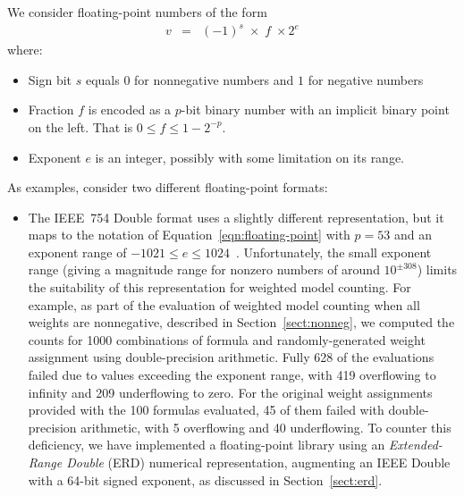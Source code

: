 \documentclass{easychair}
\begin{document}
We consider floating-point numbers of the form
\begin{eqnarray}
v & = & (-1)^s \; \times \; f \; \times 2^{e} \label{eqn:floating-point}
\end{eqnarray}
where:
\begin{itemize}
\item Sign bit $s$ equals $0$ for nonnegative numbers and $1$ for negative numbers
\item Fraction $f$ is encoded as a $p$-bit binary number with an implicit binary point on the left.  That is $0 \leq f \leq 1-2^{-p}$.
\item Exponent $e$ is an integer, possibly with some limitation on its range.
\end{itemize}
As examples, consider two different floating-point formats:
\begin{itemize}
\item The IEEE~754 Double format uses a slightly different
  representation, but it maps to the notation of
  Equation~\ref{eqn:floating-point} with $p=53$ and an exponent range
  of $-1021 \leq e \leq 1024$~\cite{overton:siam:2001}.
  Unfortunately, the small exponent range (giving a magnitude range
  for nonzero numbers of around $10^{\pm 308}$) limits the suitability
  of this representation for weighted model counting.  For example, as
  part of the evaluation of weighted model counting when all weights
  are nonnegative, described in Section~\ref{sect:nonneg}, we computed
  the counts for 1000 combinations of formula and randomly-generated
  weight assignment using double-precision arithmetic.  Fully 628 of
  the evaluations failed due to values exceeding the exponent range,
  with 419 overflowing to infinity and 209 underflowing to zero.  For
  the original weight assignments provided with the 100 formulas
  evaluated, 45 of them failed with double-precision arithmetic, with
  5 overflowing and 40 underflowing.  To counter this deficiency, we
  have implemented a floating-point library using an
  \emph{Extended-Range Double} (ERD) numerical representation,
  augmenting an IEEE Double with a 64-bit signed exponent, as
  discussed in Section~\ref{sect:erd}.


\end{itemize}
\end{document}
